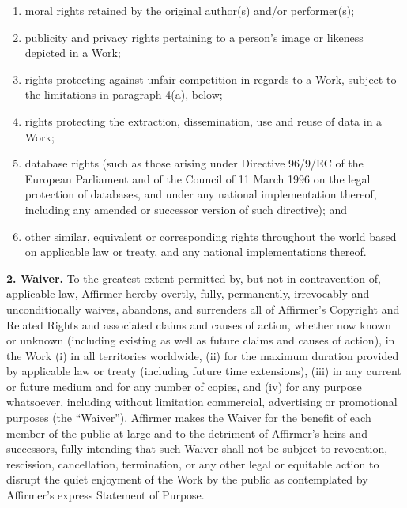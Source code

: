 {\begin{enumerate}[label=\roman*.]
    \item  moral rights retained by the original author(s) and/or
    performer(s);
    
    \item publicity and privacy rights pertaining to a person's
    image or likeness depicted in a Work;
    
    \item rights protecting against unfair competition in regards
    to a Work, subject to the limitations in paragraph 4(a),
    below;
    
    \item rights protecting the extraction, dissemination, use and
    reuse of data in a Work;
    
    \item database rights (such as those arising under Directive
    96/9/EC of the European Parliament and of the Council of 11
    March 1996 on the legal protection of databases, and under
    any national implementation thereof, including any amended
    or successor version of such directive); and
    
    \item other similar, equivalent or corresponding rights
    throughout the world based on applicable law or treaty, and
    any national implementations thereof.

  \end{enumerate}

  \noindent \textbf{2. Waiver.} To the greatest extent
  permitted by, but not in contravention of, applicable law,
  Affirmer hereby overtly, fully, permanently, irrevocably and
  unconditionally waives, abandons, and surrenders all of
  Affirmer's Copyright and Related Rights and associated claims
  and causes of action, whether now known or unknown (including
  existing as well as future claims and causes of action), in
  the Work (i) in all territories worldwide, (ii) for the
  maximum duration provided by applicable law or treaty
  (including future time extensions), (iii) in any current or
  future medium and for any number of copies, and (iv) for any
  purpose whatsoever, including without limitation commercial,
  advertising or promotional purposes (the ``Waiver''). Affirmer
  makes the Waiver for the benefit of each member of the public
  at large and to the detriment of Affirmer's heirs and
  successors, fully intending that such Waiver shall not be
  subject to revocation, rescission, cancellation, termination,
  or any other legal or equitable action to disrupt the quiet
  enjoyment of the Work by the public as contemplated by
  Affirmer's express Statement of Purpose.

}
